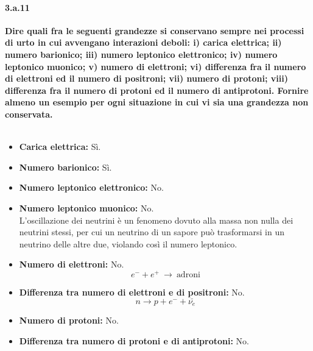 \documentclass[twoside]{article}
\begin{document}
\paragraph{3.a.11}\textbf{Dire quali fra le seguenti grandezze si conservano sempre nei processi di urto in
cui avvengano interazioni deboli: i) carica elettrica; ii) numero barionico; iii)
numero leptonico elettronico; iv) numero leptonico muonico; v) numero di
elettroni; vi) differenza fra il numero di elettroni ed il numero di positroni; vii)
numero di protoni; viii) differenza fra il numero di protoni ed il numero di
antiprotoni. Fornire almeno un esempio per ogni situazione in cui vi sia una
grandezza non conservata.}\\ \\
\begin{itemize}
    \item \textbf{Carica elettrica:} Sì.
    \item \textbf{Numero barionico:} Sì.
    \item \textbf{Numero leptonico elettronico:} No.
    \item \textbf{Numero leptonico muonico:} No.\\
   L'oscillazione dei neutrini è un fenomeno dovuto alla massa non nulla dei neutrini stessi, per cui un neutrino di un sapore può trasformarsi in un neutrino delle altre due, violando così il numero leptonico.
    \item \textbf{Numero di elettroni:} No.
    \begin{equation}
        e^- + e^+ \ \rightarrow \ \text{adroni}
    \end{equation}
    \item \textbf{Differenza tra numero di elettroni e di positroni:} No.
        \begin{equation}
            n \rightarrow p+ e^-+ \bar{\nu_e}
        \end{equation}
    \item \textbf{Numero di protoni:} No.
    \item \textbf{Differenza tra numero di protoni e di antiprotoni:} No.
\end{itemize}
\end{document}
